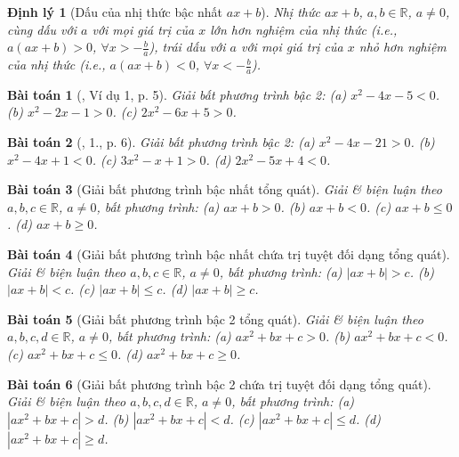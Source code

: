\documentclass{article}
\newtheorem{baitoan}{Bài toán}
\newtheorem{dinhly}{Định lý}
\begin{document}
\begin{dinhly}[Dấu của nhị thức bậc nhất $ax + b$]
	Nhị thức $ax + b$, $a,b\in\mathbb{R}$, $a\ne0$, cùng dấu với $a$ với mọi giá trị của $x$ lớn hơn nghiệm của nhị thức (i.e., $a(ax + b) > 0$, $\forall x > -\frac{b}{a}$), trái dấu với $a$ với mọi giá trị của $x$ nhỏ hơn nghiệm của nhị thức (i.e., $a(ax + b) < 0$, $\forall x < -\frac{b}{a}$).
\end{dinhly}

\begin{baitoan}[\cite{Binh_Toan_9_tap_1}, Ví dụ 1, p. 5]
	Giải bất phương trình bậc 2: (a) $x^2 - 4x - 5 < 0$. (b) $x^2 - 2x - 1 > 0$. (c) $2x^2 - 6x + 5 > 0$.
\end{baitoan}

\begin{baitoan}[\cite{Binh_Toan_9_tap_1}, 1., p. 6]
	Giải bất phương trình bậc 2: (a) $x^2 - 4x - 21 > 0$. (b) $x^2 - 4x + 1 < 0$. (c) $3x^2 - x + 1 > 0$. (d) $2x^2 - 5x + 4 < 0$.
\end{baitoan}

\begin{baitoan}[Giải bất phương trình bậc nhất tổng quát]
	Giải \& biện luận theo $a,b,c\in\mathbb{R}$, $a\ne0$, bất phương trình: (a) $ax + b > 0$. (b) $ax + b < 0$. (c) $ax + b\le0$. (d) $ax + b\ge0$.
\end{baitoan}

\begin{baitoan}[Giải bất phương trình bậc nhất chứa trị tuyệt đối dạng tổng quát]
	Giải \& biện luận theo $a,b,c\in\mathbb{R}$, $a\ne0$, bất phương trình: (a) $|ax + b| > c$. (b) $|ax + b| < c$. (c) $|ax + b|\le c$. (d) $|ax + b|\ge c$.
\end{baitoan}

\begin{baitoan}[Giải bất phương trình bậc 2 tổng quát]
	Giải \& biện luận theo $a,b,c,d\in\mathbb{R}$, $a\ne0$, bất phương trình: (a) $ax^2 + bx + c > 0$. (b) $ax^2 + bx + c < 0$. (c) $ax^2 + bx + c\le0$. (d) $ax^2 + bx + c\ge0$.
\end{baitoan}

\begin{baitoan}[Giải bất phương trình bậc 2 chứa trị tuyệt đối dạng tổng quát]
	Giải \& biện luận theo $a,b,c,d\in\mathbb{R}$, $a\ne0$, bất phương trình: (a) $|ax^2 + bx + c| > d$. (b) $|ax^2 + bx + c| < d$. (c) $|ax^2 + bx + c|\le d$. (d) $|ax^2 + bx + c|\ge d$.
\end{baitoan}
\end{document}
